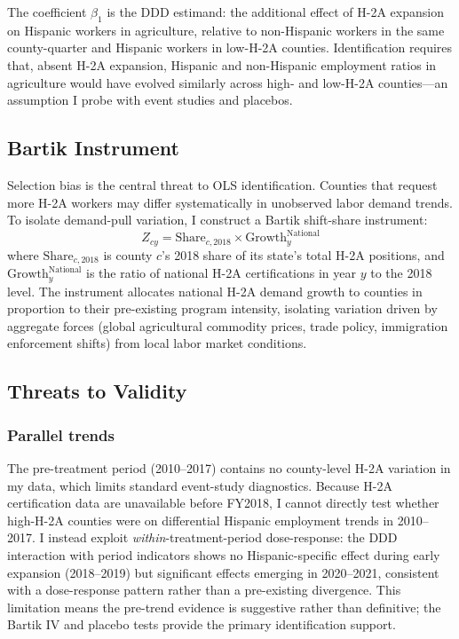 \documentclass[12pt]{article}
\begin{document}
The coefficient $\beta_1$ is the DDD estimand: the additional effect of H-2A expansion on Hispanic workers in agriculture, relative to non-Hispanic workers in the same county-quarter and Hispanic workers in low-H-2A counties. Identification requires that, absent H-2A expansion, Hispanic and non-Hispanic employment ratios in agriculture would have evolved similarly across high- and low-H-2A counties---an assumption I probe with event studies and placebos.

\subsection{Bartik Instrument}

Selection bias is the central threat to OLS identification. Counties that request more H-2A workers may differ systematically in unobserved labor demand trends. To isolate demand-pull variation, I construct a Bartik shift-share instrument:
\begin{equation}
Z_{cy} = \text{Share}_{c,2018} \times \text{Growth}_{y}^{\text{National}}
\end{equation}
where $\text{Share}_{c,2018}$ is county $c$'s 2018 share of its state's total H-2A positions, and $\text{Growth}_{y}^{\text{National}}$ is the ratio of national H-2A certifications in year $y$ to the 2018 level. The instrument allocates national H-2A demand growth to counties in proportion to their pre-existing program intensity, isolating variation driven by aggregate forces (global agricultural commodity prices, trade policy, immigration enforcement shifts) from local labor market conditions.

\subsection{Threats to Validity}

\subsubsection*{Parallel trends} The pre-treatment period (2010--2017) contains no county-level H-2A variation in my data, which limits standard event-study diagnostics. Because H-2A certification data are unavailable before FY2018, I cannot directly test whether high-H-2A counties were on differential Hispanic employment trends in 2010--2017. I instead exploit \textit{within}-treatment-period dose-response: the DDD interaction with period indicators shows no Hispanic-specific effect during early expansion (2018--2019) but significant effects emerging in 2020--2021, consistent with a dose-response pattern rather than a pre-existing divergence. This limitation means the pre-trend evidence is suggestive rather than definitive; the Bartik IV and placebo tests provide the primary identification support.
\end{document}
